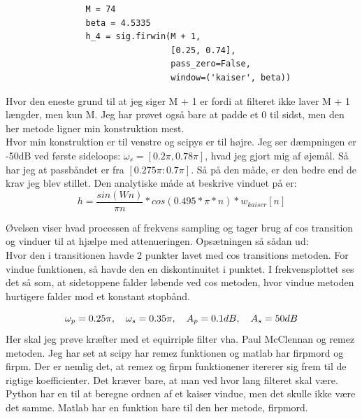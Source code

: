 \begin{Øvelser}
\begin{kapitel}
\begin{Øvelse}
            \begin{verbatim}
                M = 74 
                beta = 4.5335
                h_4 = sig.firwin(M + 1,
                                 [0.25, 0.74],
                                 pass_zero=False,
                                 window=('kaiser', beta))
            \end{verbatim} 
            Hvor den eneste grund til at jeg siger M + 1 er fordi at filteret ikke laver M + 1 længder, men kun M. 
            Jeg har prøvet også bare at padde et 0 til sidst, men den her metode ligner min konstruktion mest. 
            \\
            Hvor min konstruktion er til venstre og scipys er til højre. 
            Jeg ser dæmpningen er -50dB ved første sideloops: $\omega_s = [0.2\pi, 0.78\pi]$, hvad jeg gjort mig af øjemål. 
            Så har jeg at passbåndet er fra $[0.275\pi : 0.7\pi]$. 
            Så på den måde, er den bedre end de krav jeg blev stillet. 
            Den analytiske måde at beskrive vinduet på er: 
            \[h =  \frac{sin(W n)}{\pi n} * cos(0.495*\pi * n) * w_{kaiser}[n]\]
        \end{Øvelse}\clearpage
        
        \begin{Øvelse}
            Øvelsen viser hvad processen af frekvens sampling og tager brug af cos transition og vinduer til at hjælpe med attenueringen. 
            Opsætningen så sådan ud: 
            \\
            Hvor den i transitionen havde 2 punkter lavet med cos transitions metoden. 
            For vindue funktionen, så havde den en diskontinuitet i punktet. 
            I frekvensplottet ses det så som, at sidetoppene falder løbende ved cos metoden, 
            hvor vindue metoden hurtigere falder mod et konstant stopbånd.

        \end{Øvelse}
        \begin{Øvelse}
            \[\omega_p = 0.25\pi, \tab{0} \omega_s = 0.35\pi, \tab{0} A_p = 0.1dB, \tab{0} A_s = 50dB\]
            Her skal jeg prøve kræfter med et equirriple filter vha. Paul McClennan og remez metoden. 
            Jeg har set at scipy har remez funktionen og matlab har firpmord og firpm. 
            Der er nemlig det, at remez og firpm funktionener itererer sig frem til de rigtige koefficienter. 
            Det kræver bare, at man ved hvor lang filteret skal være. 
            Python har en til at beregne ordnen af et kaiser vindue, men det skulle ikke være det samme. 
            Matlab har en funktion bare til den her metode, firpmord. \\\\


\end{Øvelse}
\end{kapitel}
\end{Øvelser}
